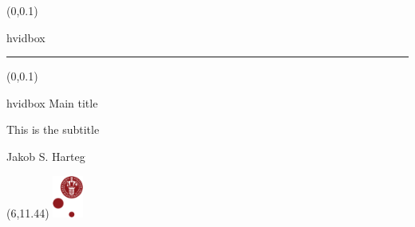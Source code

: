 \documentclass[t,24pt]{beamer}
\begin{document}
{
\begin{frame}
    \begin{textblock*}{\textwidth}(0\textwidth,0.1\textheight)
        \begin{beamercolorbox}[wd=6.3cm,ht=7.7cm,sep=0.5cm]{hvidbox}
            \fontsize{4}{10}\selectfont {}
            \noindent\textcolor{KUrod}{\rule{5.3cm}{0.4pt}}
        \end{beamercolorbox}
    \end{textblock*}
    \begin{textblock*}{\textwidth}(0\textwidth,0.1\textheight)
        \begin{beamercolorbox}[wd=6.3cm,sep=0.5cm]{hvidbox}
                \Huge \textcolor{KUrod}{Main title}
                \vspace{0.5cm}
                \par
                \Large This is the subtitle
                \vspace{0.5cm}
                \par
                \normalsize Jakob S. Harteg
        \end{beamercolorbox}
    \end{textblock*}
    \begin{textblock}{1}(6,11.44)
        \includegraphics[width=1cm]{KU/KU-logo.png}
    \end{textblock}
\end{frame}
}
\end{document}
